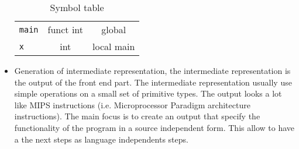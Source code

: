 \documentclass[../main.tex]{subfiles}
\begin{document}
\begin{itemize}
\begin{table}[ht]
\begin{tabular}[t]{lcc}
        \hline
        \texttt{main}&funct int&global\\
        \texttt{x}&int &local main\\
        \hline
        \end{tabular}
        \caption{Symbol table}
        \end{table}%
    \item Generation of intermediate representation, the intermediate representation is the output of the front end part. The intermediate representation usually use simple operations on a small set of primitive types. The output looks a lot like MIPS instructions (i.e. Microprocessor Paradigm architecture instructions). The main focus is to create an output that specify the functionality of the program in a source independent form. This allow to have a the next steps as language independents steps. 
\end{itemize}
\cleardoublepage
\end{document}
